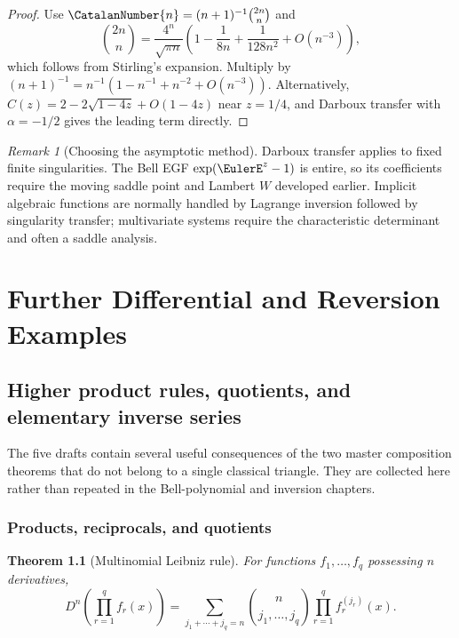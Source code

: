 \documentclass[11pt,a4paper,oneside,openany]{book}
\newtheorem{theorem}{Theorem}[chapter]
\theoremstyle{definition}
\theoremstyle{remark}
\newtheorem{remark}[theorem]{Remark}
\begin{document}
\begin{proof}
Use $\CatalanNumber{n}=(n+1)^{-1}\binom{2n}{n}$ and
\[
 \binom{2n}{n}=\frac{4^n}{\sqrt{\pi n}}
 \left(1-\frac1{8n}+\frac1{128n^2}+O(n^{-3})\right),
\]
which follows from Stirling's expansion.  Multiply by
$(n+1)^{-1}=n^{-1}(1-n^{-1}+n^{-2}+O(n^{-3}))$.
Alternatively, $C(z)=2-2\sqrt{1-4z}+O(1-4z)$ near $z=1/4$, and Darboux
transfer with $\alpha=-1/2$ gives the leading term directly.
\end{proof}

\begin{remark}[Choosing the asymptotic method]
Darboux transfer applies to fixed finite singularities.  The Bell EGF
$\exp(\EulerE^z-1)$ is entire, so its coefficients require the moving saddle point
and Lambert $W$ developed earlier.  Implicit algebraic functions are normally
handled by Lagrange inversion followed by singularity transfer; multivariate
systems require the characteristic determinant and often a saddle analysis.
\end{remark}

\part{Further Differential and Reversion Examples}

\chapter{Higher product rules, quotients, and elementary inverse series}
\label{ch:merged-further-calculus}

The five drafts contain several useful consequences of the two master
composition theorems that do not belong to a single classical triangle.  They
are collected here rather than repeated in the Bell-polynomial and inversion
chapters.

\section{Products, reciprocals, and quotients}

\begin{theorem}[Multinomial Leibniz rule]
\label{thm:merged-multinomial-leibniz}
For functions $f_1,\ldots,f_q$ possessing $n$ derivatives,
\begin{equation}
 D^n\!\left(\prod_{r=1}^{q}f_r(x)\right)
 =\sum_{j_1+\cdots+j_q=n}
   \binom{n}{j_1,\ldots,j_q}
   \prod_{r=1}^{q}f_r^{(j_r)}(x).                                  \label{eq:merged-multinomial-leibniz}
\end{equation}
\end{theorem}
\end{document}
